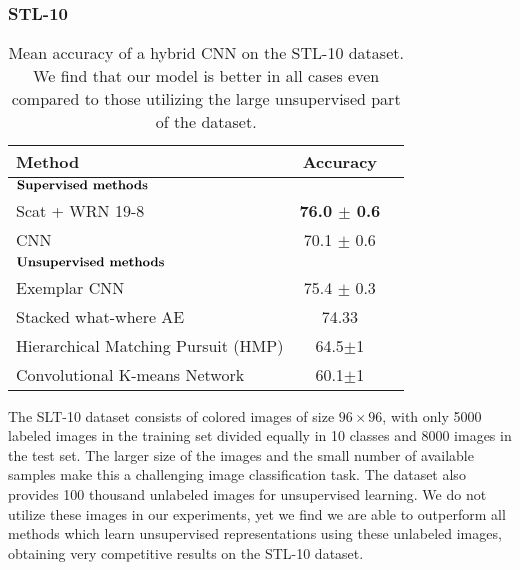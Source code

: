 \documentclass[10pt,twocolumn,letterpaper]{article}
\begin{document}
\subsubsection{STL-10}
\begin{table}
\begin{center}


\begin{tabular}{|l|c|c|}
\hline
\bf Method & \bf Accuracy \\
\hline

$\substack{\text{\small \bf  Supervised methods}}  $     &  \\
Scat + WRN 19-8 & \bf 76.0 $\pm$ 0.6\\
CNN\cite{swersky2013multi} &  70.1 $\pm$ 0.6\\
\hline
$\substack{\text{\small \bf  Unsupervised methods}}  $     &  \\
Exemplar CNN \cite{dosovitskiy2014discriminative}&  75.4 $\pm$ 0.3\\
Stacked what-where AE \cite{StackedYann} & 74.33 \\
Hierarchical Matching Pursuit (HMP) \cite{bo2013unsupervised}& 64.5$\pm$1\\
Convolutional K-means Network \cite{coates2011selecting} & 60.1$\pm$1\\
\hline
\end{tabular}
\end{center}
\caption{Mean accuracy of a hybrid CNN on the STL-10 dataset. We  find that our model is  better in all cases even compared to those utilizing the large unsupervised part of the dataset.}

\label{tab:small_STL}
\end{table}
The SLT-10 dataset consists of colored images of size $96\times 96$, with only 5000 labeled images in the training set divided equally in 10 classes and 8000 images in the test set. The larger size of the images and the small number of available samples make this a challenging image classification task. The dataset also provides 100 thousand unlabeled images for unsupervised learning. We do not utilize these images in our experiments, yet we find we are able to outperform all methods which learn unsupervised representations using these unlabeled images, obtaining very competitive results on the STL-10 dataset. 
\end{document}
